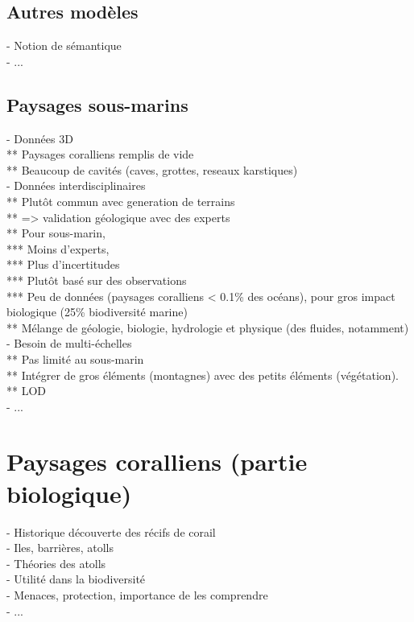 \subsection{Autres modèles}
- Notion de sémantique \\
- ...

\subsection{Paysages sous-marins}
- Données 3D \\
** Paysages coralliens remplis de vide \\
** Beaucoup de cavités (caves, grottes, reseaux karstiques) \\
- Données interdisciplinaires \\
** Plutôt commun avec generation de terrains\\
** => validation géologique avec des experts \\
** Pour sous-marin, \\
*** Moins d'experts, \\
*** Plus d'incertitudes \\
*** Plutôt basé sur des observations \\
*** Peu de données (paysages coralliens < 0.1\% des océans), pour gros impact biologique (25\% biodiversité marine) \\
** Mélange de géologie, biologie, hydrologie et physique (des fluides, notamment) \\
- Besoin de multi-échelles \\
** Pas limité au sous-marin \\
** Intégrer de gros éléments (montagnes) avec des petits éléments (végétation). \\
** LOD \\
- ...



\section{Paysages coralliens (partie biologique)}
- Historique découverte des récifs de corail \\
- Iles, barrières, atolls \\
- Théories des atolls \\
- Utilité dans la biodiversité \\
- Menaces, protection, importance de les comprendre \\
- ...


